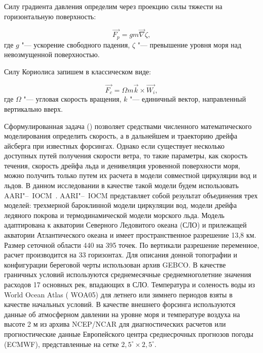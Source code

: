 Силу градиента давления определим через проекцию силы тяжести на горизонтальную поверхность:

\begin{equation}
\label{eq:equation4_5}
\vec{F_{p}} = gm\vec{\nabla}\zeta,
\end{equation}
где $g$ "--- ускорение свободного падения, $\zeta$ "--- превышение уровня моря над невозмущенной поверхностью.

Силу Кориолиса запишем в классическом виде:

\begin{equation}
\label{eq:equation4_6}
\vec{F_{c}} = \Omega m\vec{k}\times \vec{W_i},
\end{equation}
где $\Omega$ "--- угловая скорость вращения, $k$ "--- единичный вектор, направленный вертикально вверх.

Сформулированная задача () позволяет средствами численного математического моделирования определить скорость, а в дальнейшем и траекторию дрейфа айсберга при известных форсингах. Однако если существует несколько доступных путей получения скорости ветра, то такие параметры, как скорость течения, скорость дрейфа льда и денивеляция уровенной поверхности моря, можно получить только путем их расчета в модели совместной циркуляции вод и льдов. В данном исследовании в качестве такой модели будем использовать AARI"--~IOCM~\cite{Kulakov2012}. AARI"--~IOCM представляет собой результат объединения трех моделей: трехмерной бароклинной модели циркуляции вод, модели дрейфа ледяного покрова и термодинамической модели морского льда. Модель адаптирована к акватории Северного Ледовитого океана (СЛО) и прилежащей акватории Атлантического океана и имеет пространственное разрешение 13,8 км. Размер сеточной области 440 на 395 точек. По вертикали разрешение переменное, расчет производится на 33 горизонтах. Для описания донной топографии и конфигурации береговой черты использован архив GEBCO. В качестве граничных условий используются среднемесячные среднемноголетние значения расходов 17 основных рек, впадающих в СЛО. Температура и соленость воды из World Ocean Atlas ( WOA05) для летнего или зимнего периодов взяты в качестве начальных условий. В качестве внешнего форсинга используются данные об атмосферном давлении на уровне моря и температуре воздуха на высоте 2 м из архива NCEP/NCAR для диагностических расчетов или прогностические данные Европейского центра среднесрочных прогнозов погоды (ECMWF), представленные на сетке $2,5^\circ \times 2,5^\circ$.

